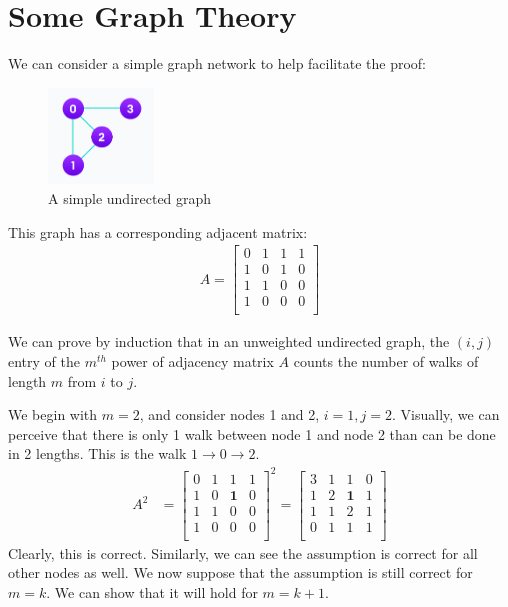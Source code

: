 \documentclass{assignment}
\begin{document}

\section{Some Graph Theory}
We can consider a simple graph network to help facilitate the proof:
\begin{figure}[H]
    \centering
    \includegraphics[width=0.25\textwidth]{LaTeX Images/UUG.png}
    \caption{A simple undirected graph}
    \label{fig:my_label}
\end{figure}

This graph has a corresponding adjacent matrix:
\begin{align*}
    A = \begin{bmatrix}
        0 & 1 & 1 & 1 \\
        1 & 0 & 1 & 0 \\
        1 & 1 & 0 & 0 \\
        1 & 0 & 0 & 0 \\
    \end{bmatrix}
\end{align*}

We can prove by induction that in an unweighted undirected graph, the $(i, j)$ entry of the $m^{th}$ power of adjacency matrix $A$ counts the number of walks of length $m$ from $i$ to $j$.  

We begin with $m=2$, and consider nodes 1 and 2, $i=1, j=2$. Visually, we can perceive that there is only 1 walk between node 1 and node 2 than can be done in 2 lengths. This is the walk $1 \rightarrow 0 \rightarrow 2$.
\begin{align*}
    A^2 &= 
    \begin{bmatrix}
        0 & 1 & 1 & 1 \\
        1 & 0 & \textbf{1} & 0 \\
        1 & 1 & 0 & 0 \\
        1 & 0 & 0 & 0 \\
    \end{bmatrix}^2
    = \begin{bmatrix}
        3 & 1 & 1 & 0 \\
        1 & 2 & \textbf{1} & 1 \\
        1 & 1 & 2 & 1 \\
        0 & 1 & 1 & 1 \\
    \end{bmatrix}
\end{align*}
Clearly, this is correct. Similarly, we can see the assumption is correct for all other nodes as well. We now suppose that the assumption is still correct for $m=k$. We can show that it will hold for $m=k+1$.
\end{document}
